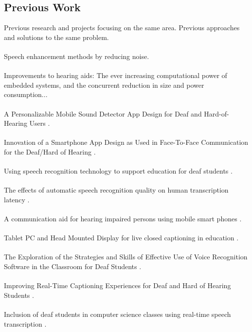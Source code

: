 \documentclass[english, 12pt, a4paper, pdftex, elec, utf8]{aaltothesis}
\begin{document}
\subsection{Previous Work} \label{subsec:work}

Previous research and projects focusing on the same area. Previous approaches and solutions to the same problem. \\\\
Speech enhancement methods by reducing noise. \cite{goehring2016speech} \\\\
Improvements to hearing aids: The ever increasing computational power of embedded systems, and the concurrent reduction in size and power consumption... \\\\
A Personalizable Mobile Sound Detector App Design for Deaf and Hard-of-Hearing Users \cite{bragg2016personalizable}. \\\\
Innovation of a Smartphone App Design as Used in Face-To-Face Communication for the Deaf/Hard of Hearing \cite{chang2015}. \\\\
Using speech recognition technology to support education for deaf students \cite{fen2010using}. \\\\
The effects of automatic speech recognition quality on human transcription latency \cite{gaur2016effects}. \\\\
A communication aid for hearing impaired persons using mobile smart phones \cite{hirayama2011communication}. \\\\
Tablet PC and Head Mounted Display for live closed captioning in education \cite{jimenez2011tablet}. \\\\
The Exploration of the Strategies and Skills of Effective Use of Voice Recognition Software in the Classroom for Deaf Students \cite{jun2010exploration}. \\\\
Improving Real-Time Captioning Experiences for Deaf and Hard of Hearing Students \cite{kawas2016improving}. \\\\
Inclusion of deaf students in computer science classes using real-time speech transcription \cite{kheir2007inclusion}. \\\\
\end{document}
